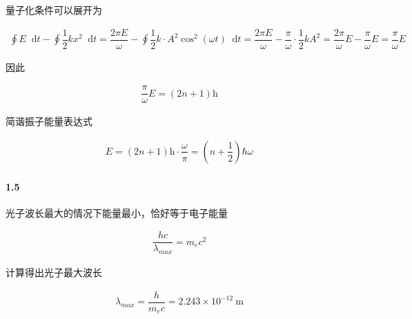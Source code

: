 \documentclass{article}
\newcommand*{\md}{\mathop{}\!\mathrm{d}}
\newcommand*{\mh}{\mathrm{h}}
\newcommand{\si}[1]{\  \mathrm{#1}}
\begin{document}
量子化条件可以展开为

\begin{equation*}
  \begin{aligned}
    \oint E \md t - \oint \dfrac{1}{2} k x^2 \md t = \dfrac{2 \pi E}{\omega} - \oint \dfrac{1}{2} k \cdot A^2 \cos^2 \left( \omega t \right) \md t = \dfrac{2 \pi E}{\omega} - \dfrac{\pi}{\omega} \cdot \dfrac{1}{2}  k A^2 = \dfrac{2 \pi}{\omega} E - \dfrac{\pi}{\omega} E = \dfrac{\pi}{\omega} E   
  \end{aligned}
\end{equation*}

因此

\begin{equation*}
  \begin{aligned}
    \dfrac{\pi}{\omega} E = \left( 2 n + 1 \right) \mh 
  \end{aligned}
\end{equation*}

简谐振子能量表达式

\begin{equation*}
  \begin{aligned}
    E = \left( 2n + 1 \right) \mh \cdot \dfrac{\omega}{\pi} = \left( n + \dfrac{1}{2}  \right) \hbar \omega 
  \end{aligned}
\end{equation*}

\paragraph{1.5}

光子波长最大的情况下能量最小，恰好等于电子能量

\begin{equation*}
  \begin{aligned}
    \dfrac{h c}{\lambda_{max}} = m_e c^2 
  \end{aligned}
\end{equation*}

计算得出光子最大波长

\begin{equation*}
  \begin{aligned}
    \lambda_{max} = \dfrac{h}{m_e c} = 2.243 \times 10^{-12} \si{m} 
  \end{aligned}
\end{equation*}
\end{document}

